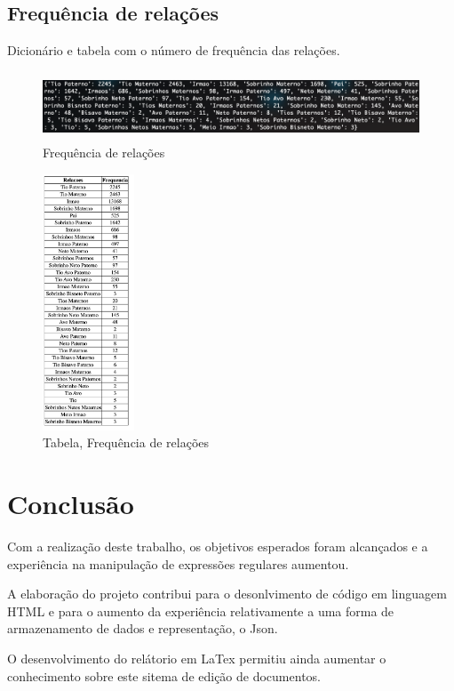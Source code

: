 \documentclass[a4paper, 12pt]{article}
\begin{document}
\subsection{Frequência de relações}
Dicionário e tabela com o número de frequência das relações.
\begin{figure}[H]
    \centering
    \includegraphics[height=0.8in]{4.png}
    \caption{Frequência de relações}
    \label{fig:my_label}
\end{figure}
\begin{figure}[H]
    \centering
    \includegraphics[height=3in]{4-tabela.png}
    \caption{Tabela, Frequência de relações}
    \label{fig:my_label}
\end{figure}
\newpage
\section{Conclusão}
Com a realização deste trabalho, os objetivos esperados foram alcançados e a experiência na manipulação de expressões regulares aumentou.

A elaboração do projeto contribui para o desonlvimento de código em linguagem HTML e para o aumento da experiência relativamente a uma forma de armazenamento de dados e representação, o Json.

O desenvolvimento do relátorio em LaTex permitiu ainda aumentar o conhecimento sobre este sitema de edição de documentos.
\end{document}
